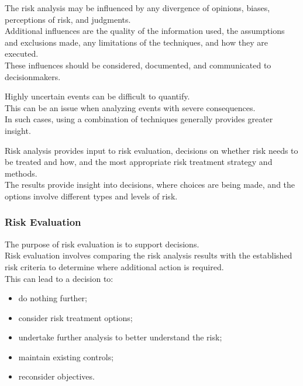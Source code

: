 \documentclass[letterpaper,10pt,english]{jupyterBook}
\begin{document}
\sphinxAtStartPar
The risk analysis may be influenced by any divergence of opinions, biases, perceptions of risk, and judgments. \\
Additional influences are the quality of the information used, the assumptions and exclusions made, any limitations of the techniques, and how they are executed. \\
These influences should be considered, documented, and communicated to decision\sphinxhyphen{}makers.

\sphinxAtStartPar
Highly uncertain events can be difficult to quantify. \\
This can be an issue when analyzing events with severe consequences. \\
In such cases, using a combination of techniques generally provides greater insight.

\sphinxAtStartPar
Risk analysis provides input to risk evaluation, decisions on whether risk needs to be treated and how, and the most appropriate risk treatment strategy and methods. \\
The results provide insight into decisions, where choices are being made, and the options involve different types and levels of risk.


\subsubsection{Risk Evaluation}
\label{\detokenize{PM/rm:risk-evaluation}}
\sphinxAtStartPar
The purpose of risk evaluation is to support decisions. \\
Risk evaluation involves comparing the risk analysis results with the established risk criteria to determine where additional action is required. \\
This can lead to a decision to:
\begin{itemize}
\item {} 
\sphinxAtStartPar
do nothing further;

\item {} 
\sphinxAtStartPar
consider risk treatment options;

\item {} 
\sphinxAtStartPar
undertake further analysis to better understand the risk;

\item {} 
\sphinxAtStartPar
maintain existing controls;

\item {} 
\sphinxAtStartPar
reconsider objectives.

\end{itemize}
\end{document}
